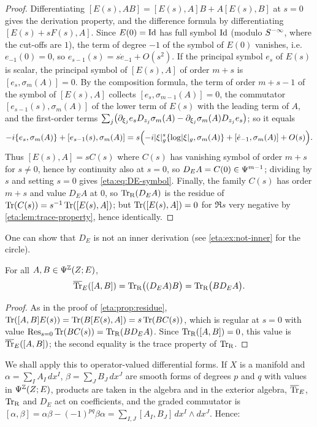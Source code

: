 \begin{proof} Differentiating $[E(s),AB]=[E(s),A]B+A[E(s),B]$ at $s=0$ gives the
derivation property, and the difference formula by
differentiating $[E(s)+sF(s),A]$. Since $E(0)=\operatorname{Id}$ has full symbol $\operatorname{Id}$ (modulo
$S^{-\infty}$, where the cut-offs are $1$), the term of degree $-1$ of the symbol
of $E(0)$ vanishes, i.e.\ $e_{-1}(0)=0$, so $e_{s-1}(s)=s\dot e_{-1}+O(s^2)$. If the
principal symbol $e_s$ of $E(s)$ is scalar, the principal symbol of $[E(s),A]$ of
order $m+s$ is $[e_s,\sigma_m(A)]=0$. By the composition formula, the term of order
$m+s-1$ of the symbol of $[E(s),A]$ collects $[e_s,\sigma_{m-1}(A)]=0$, the
commutator $[e_{s-1}(s),\sigma_m(A)]$ of the lower term of $E(s)$ with the leading
term of $A$, and the first-order terms $\sum_j\bigl(\partial_{\xi_j}e_sD_{z_j}\sigma_m(A)
-\partial_{\xi_j}\sigma_m(A)D_{z_j}e_s\bigr)$; so it equals
\[
-i\{e_s,\sigma_m(A)\}+[e_{s-1}(s),\sigma_m(A)]
=s\Bigl(-i\lvert \xi\rvert_g^s\{\log\lvert \xi\rvert_g,\sigma_m(A)\}+[\dot e_{-1},\sigma_m(A)]+O(s)\Bigr).
\]
Thus $[E(s),A]=sC(s)$ where $C(s)$ has vanishing symbol of order $m+s$ for $s\ne0$,
hence by continuity also at $s=0$, so $D_EA=C(0)\in\Psi^{m-1}$; dividing by $s$ and
setting $s=0$ gives \eqref{eta:eq:DE-symbol}. Finally, the
family $C(s)$ has order $m+s$ and value $D_EA$ at $0$, so $\operatorname{Tr}_{\mathrm{R}}(D_EA)$ is the residue
of $\operatorname{Tr}(C(s))=s^{-1}\operatorname{Tr}([E(s),A])$; but $\operatorname{Tr}([E(s),A])=0$ for $\Re s$ very negative by
\cref{eta:lem:trace-property}, hence identically.
\end{proof}

One can show that $D_E$ is not an inner derivation (see \cref{eta:ex:not-inner} for the
circle).

\begin{lemma}\label{eta:lem:trace-defect}
For all $A,B\in\Psi^{\mathbb{Z}}(Z;E)$,
\[
\overline{\operatorname{Tr}}_E([A,B])=\operatorname{Tr}_{\mathrm{R}}\bigl((D_EA)B\bigr)=\operatorname{Tr}_{\mathrm{R}}\bigl(BD_EA\bigr).
\]
\end{lemma}

\begin{proof} As in the proof of \cref{eta:prop:residue},
$\operatorname{Tr}([A,B]E(s))=\operatorname{Tr}(B[E(s),A])=s\operatorname{Tr}(BC(s))$, which is regular at $s=0$ with value
$\operatorname*{Res}_{s=0}\operatorname{Tr}(BC(s))=\operatorname{Tr}_{\mathrm{R}}(BD_EA)$. Since $\operatorname{Tr}_{\mathrm{R}}([A,B])=0$, this value is
$\overline{\operatorname{Tr}}_E([A,B])$; the second equality is the trace property of $\operatorname{Tr}_{\mathrm{R}}$.
\end{proof}

We shall apply this to operator-valued differential forms. If $X$ is a manifold and
$\alpha=\sum_IA_I\,dx^I$, $\beta=\sum_JB_J\,dx^J$ are smooth forms of degrees $p$ and
$q$ with values in $\Psi^{\mathbb{Z}}(Z;E)$, products are taken in the algebra and in the
exterior algebra, $\overline{\operatorname{Tr}}_E$, $\operatorname{Tr}_{\mathrm{R}}$ and $D_E$ act on coefficients, and the graded
commutator is $[\alpha,\beta]=\alpha\beta-(-1)^{pq}\beta\alpha
=\sum_{I,J}[A_I,B_J]\,dx^I\wedge dx^J$. Hence:

